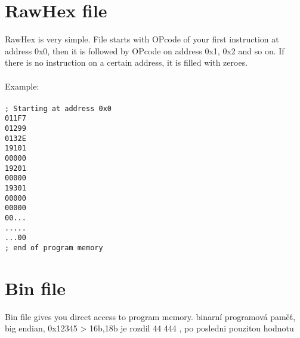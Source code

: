         \section{RawHex file}
             RawHex is very simple. File starts with OPcode of your first instruction at address 0x0, then it is followed by OPcode on address 0x1, 0x2
             and so on. If there is no instruction on a certain address, it is filled with zeroes.\\\\
             Example:
            {
                ~\\
                \usecodefont\\
                \verb'; Starting at address 0x0'\\
                \verb'011F7'\\
                \verb'01299'\\
                \verb'0132E'\\
                \verb'19101'\\
                \verb'00000'\\
                \verb'19201'\\
                \verb'00000'\\
                \verb'19301'\\
                \verb'00000'\\
                \verb'00000'\\
                \verb'00...'\\
                \verb'.....'\\
                \verb'...00'\\
                \verb'; end of program memory'\\
            }
        \section{Bin file}
        Bin file gives you direct access to program memory.   
        binarní programová paměť, big endian, 0x12345 > 16b,18b je rozdil 44  444   , po posledni pouzitou hodnotu

